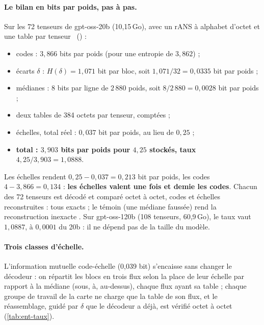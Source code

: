\paragraph{Le bilan en bits par poids, pas à pas.} Sur les 72 tenseurs de gpt-oss-20b (10,15\,Go), avec un rANS à alphabet d'octet et une table par tenseur \mes~() :
\begin{itemize}
\item codes : $3{,}866$ bits par poids (pour une entropie de $3{,}862$) ;
\item écarts $\delta$ : $H(\delta) = 1{,}071$ bit par bloc, soit $1{,}071/32 = 0{,}0335$ bit par poids ;
\item médianes : 8 bits par ligne de $2\,880$ poids, soit $8/2\,880 = 0{,}0028$ bit par poids ;
\item deux tables de 384 octets par tenseur, comptées ;
\item échelles, total réel : $0{,}037$ bit par poids, au lieu de $0{,}25$ ;
\item \textbf{total : $3{,}903$ bits par poids pour $4{,}25$ stockés, taux $4{,}25/3{,}903 = 1{,}0888$}.
\end{itemize}
Les échelles rendent $0{,}25 - 0{,}037 = 0{,}213$ bit par poids, les codes $4 - 3{,}866 = 0{,}134$ \calc : \textbf{les échelles valent une fois et demie les codes}. Chacun des 72 tenseurs est décodé et comparé octet à octet, codes et échelles reconstruites : tous exacts ; le témoin (une médiane faussée) rend la reconstruction inexacte \mes. Sur gpt-oss-120b (108 tenseurs, 60,9\,Go), le taux vaut $1{,}0887$, à $0{,}0001$ du 20b : il ne dépend pas de la taille du modèle.

\paragraph{Trois classes d'échelle.} L'information mutuelle code-échelle (0,039 bit) s'encaisse sans changer le décodeur : on répartit les blocs en trois flux selon la place de leur échelle par rapport à la médiane (sous, à, au-dessus), chaque flux ayant sa table ; chaque groupe de travail de la carte ne charge que la table de son flux, et le réassemblage, guidé par $\delta$ que le décodeur a déjà, est vérifié octet à octet (\cref{tab:ent-taux}).

